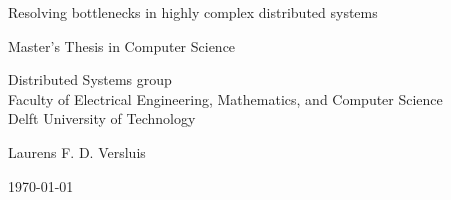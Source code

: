 \begin{titlepage}

  \begin{center}
  \null\vfill
    \begin{center}
    \LARGE{Resolving bottlenecks in highly complex distributed systems}
    \end{center}

    \vspace{3cm}

    \begin{large}
    Master's Thesis in Computer Science
    \end{large}

    \vspace{1.5cm}

    \begin{normalsize}
	Distributed Systems group\\
    Faculty of Electrical Engineering, Mathematics, and Computer Science\\
    Delft University of Technology
    \end{normalsize}

    \vspace{2.0cm}

    \begin{normalsize}
    Laurens F. D. Versluis
    \end{normalsize}

    \vspace{1.0cm}

    \today

  \vfill
  \end{center}

\end{titlepage}

